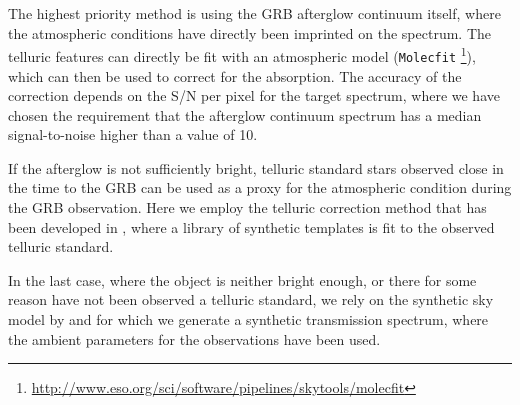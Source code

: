 \documentclass{aa}    %
\begin{document}
The highest priority method is using the GRB afterglow continuum itself, where
the atmospheric conditions have directly been imprinted on the spectrum. The
telluric features can directly be fit with an atmospheric model
(\texttt{Molecfit} \citep{Smette2015,
	Kausch2015}\footnote{\url{http://www.eso.org/sci/software/pipelines/skytools/molecfit}}), which can then be used to correct for the absorption. The accuracy of the correction depends on the S/N per pixel for the target spectrum, where we have chosen the requirement that the afterglow continuum spectrum has a median signal-to-noise higher than a value of 10.

If the afterglow is not sufficiently bright, telluric standard stars observed
close in the time to the GRB can be used as a proxy for the atmospheric
condition during the GRB observation. Here we employ the telluric correction
method that has been developed in \citet{Selsing2015}, where a library of
synthetic templates is fit to the observed telluric standard.

In the last case, where the object is neither bright enough, or there for some
reason have not been observed a telluric standard, we rely on the synthetic sky
model by \citet{Noll2012} and \citet{Jones2013} for which we generate a
synthetic transmission spectrum,  where the ambient parameters for the
observations have been used.
\end{document}
